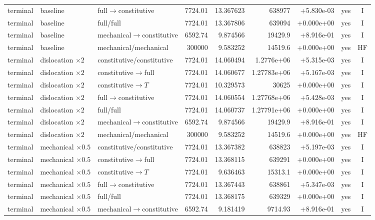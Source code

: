 \begin{landscape}
\begin{longtable}{@{}p{1.15cm}p{2.55cm}p{3.60cm}rrrrcc@{}}
terminal & baseline & full$\rightarrow$constitutive & 7724.01 & 13.367623 & 638977 & +5.830e-03 & yes & I \\
terminal & baseline & full/full & 7724.01 & 13.367806 & 639094 & +0.000e+00 & yes & I \\
terminal & baseline & mechanical$\rightarrow$constitutive & 6592.74 & 9.874566 & 19429.9 & +8.916e-01 & yes & I \\
terminal & baseline & mechanical/mechanical & 300000 & 9.583252 & 14519.6 & +0.000e+00 & yes & HF \\
terminal & dislocation $\times2$ & constitutive/constitutive & 7724.01 & 14.060494 & 1.2776e+06 & +5.315e-03 & yes & I \\
terminal & dislocation $\times2$ & constitutive$\rightarrow$full & 7724.01 & 14.060677 & 1.27783e+06 & +5.167e-03 & yes & I \\
terminal & dislocation $\times2$ & constitutive$\rightarrow T$ & 7724.01 & 10.329573 & 30625 & +0.000e+00 & yes & I \\
terminal & dislocation $\times2$ & full$\rightarrow$constitutive & 7724.01 & 14.060554 & 1.27768e+06 & +5.428e-03 & yes & I \\
terminal & dislocation $\times2$ & full/full & 7724.01 & 14.060737 & 1.27791e+06 & +0.000e+00 & yes & I \\
terminal & dislocation $\times2$ & mechanical$\rightarrow$constitutive & 6592.74 & 9.874566 & 19429.9 & +8.916e-01 & yes & I \\
terminal & dislocation $\times2$ & mechanical/mechanical & 300000 & 9.583252 & 14519.6 & +0.000e+00 & yes & HF \\
terminal & mechanical $\times0.5$ & constitutive/constitutive & 7724.01 & 13.367382 & 638823 & +5.197e-03 & yes & I \\
terminal & mechanical $\times0.5$ & constitutive$\rightarrow$full & 7724.01 & 13.368115 & 639291 & +0.000e+00 & yes & I \\
terminal & mechanical $\times0.5$ & constitutive$\rightarrow T$ & 7724.01 & 9.636463 & 15313.1 & +0.000e+00 & yes & I \\
terminal & mechanical $\times0.5$ & full$\rightarrow$constitutive & 7724.01 & 13.367443 & 638861 & +5.347e-03 & yes & I \\
terminal & mechanical $\times0.5$ & full/full & 7724.01 & 13.368175 & 639329 & +0.000e+00 & yes & I \\
terminal & mechanical $\times0.5$ & mechanical$\rightarrow$constitutive & 6592.74 & 9.181419 & 9714.93 & +8.916e-01 & yes & I \\

\end{longtable}
\end{landscape}

